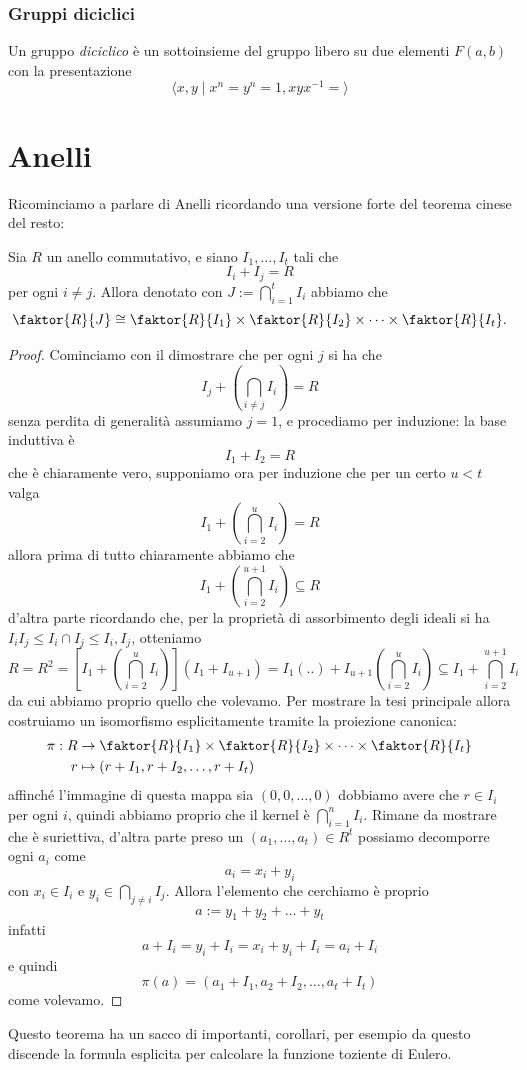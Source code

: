 \documentclass[11pt]{scrartcl}
\begin{document}
	\subsubsection{Gruppi diciclici}
	
	\begin{definition}
		Un gruppo \textit{diciclico} è un sottoinsieme del gruppo libero su due elementi $F(a,b)$ con la presentazione
		$$\langle x,y\mid x^{n}=y^n=1,xyx^{-1}=\rangle$$
	\end{definition}
	
	\newpage
	
	\section{Anelli}
	Ricominciamo a parlare di Anelli ricordando una versione forte del teorema cinese del resto:
	\begin{theorem}
		Sia $R$ un anello commutativo, e siano $I_1,\dots,I_t$ tali che 
		$$I_i+I_j=R$$
		per ogni $i\ne j$. Allora denotato con $J:=\bigcap_{i=1}^t I_i$ abbiamo che 
		$$\faktor{R}{J}\cong \faktor{R}{I_1}\times \faktor{R}{I_2}\times \dots \times \faktor{R}{I_t}.$$
	\end{theorem}
	\begin{proof}
		Cominciamo con il dimostrare che per ogni $j$ si ha che
		$$I_j+\left(\bigcap_{i\ne j}I_i\right)=R$$
		senza perdita di generalità assumiamo $j=1$, e procediamo per induzione: la base induttiva è 
		$$I_1+I_2=R$$
		che è chiaramente vero, supponiamo ora per induzione che per un certo $u<t$ valga
		$$I_1+\left(\bigcap_{i=2}^u I_i\right)=R$$
		allora prima di tutto chiaramente abbiamo che
		$$I_1+\left(\bigcap_{i=2}^{u+1}I_i\right)\subseteq R$$
		d'altra parte ricordando che, per la proprietà di assorbimento degli ideali si ha $I_iI_j\le I_i \cap I_j\le I_i,I_j$, otteniamo
		$$R=R^2=\left[I_1+\left(\bigcap_{i=2}^{u}I_i\right)\right]\left(I_1+I_{u+1}\right)=I_1\left(..\right)+I_{u+1}\left(\bigcap_{i=2}^u I_i\right)\subseteq I_1+\bigcap_{i=2}^{u+1}I_i$$
		da cui abbiamo proprio quello che volevamo. Per mostrare la tesi principale allora costruiamo un isomorfismo esplicitamente tramite la proiezione canonica:
		\begin{align*}
			\pi: R & \to \faktor{R}{I_1}\times \faktor{R}{I_2}\times \dots \times \faktor{R}{I_t} \\
			r & \mapsto \left(r+I_1,r+I_2,\dots,r+I_t\right)
		\end{align*}
		affinché l'immagine di questa mappa sia $(0,0,\dots,0)$ dobbiamo avere che $r\in I_i$ per ogni $i$, quindi abbiamo proprio che il kernel è $\bigcap_{i=1}^n I_i$. Rimane da mostrare che è suriettiva, d'altra parte preso un $(a_1,\dots,a_t)\in R^t$ possiamo decomporre ogni $a_i$ come
		$$a_i=x_i+y_i$$
		con $x_i\in I_i$ e $y_i\in \bigcap_{j\ne i} I_j$. Allora l'elemento che cerchiamo è proprio
		$$a:=y_1+y_2+\dots+y_t$$
		infatti 
		$$a+I_i=y_i+I_i=x_i+y_i+I_i=a_i+I_i$$
		e quindi
		$$\pi(a)=\left(a_1+I_1,a_2+I_2,\dots,a_t+I_t\right)$$
		come volevamo.
	\end{proof}
	Questo teorema ha un sacco di importanti, corollari, per esempio da questo discende la formula esplicita per calcolare la funzione toziente di Eulero. 
	
\end{document}
